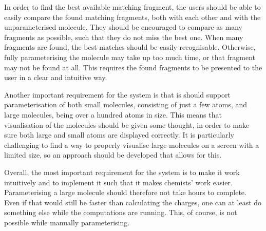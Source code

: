 In order to find the best available matching fragment, the users should be able to easily compare the found matching fragments, both with each other and with the unparameterised molecule. They should be encouraged to compare as many fragments as possible, such that they do not miss the best one. When many fragments are found, the best matches should be easily recognisable. Otherwise, fully parameterising the molecule may take up too much time, or that fragment may not be found at all. This requires the found fragments to be presented to the user in a clear and intuitive way.

Another important requirement for the system is that is should support parameterisation of both small molecules, consisting of just a few atoms, and large molecules, being over a hundred atoms in size. This means that visualisation of the molecules should be given some thought, in order to make sure both large and small atoms are displayed correctly. It is particularly challenging to find a way to properly visualise large molecules on a screen with a limited size, so an approach should be developed that allows for this.

Overall, the most important requirement for the system is to make it work intuitively and to implement it such that it makes chemists' work easier. Parameterising a large molecule should therefore not take hours to complete. Even if that would still be faster than calculating the charges, one can at least do something else while the computations are running. This, of course, is not possible while manually parameterising.
